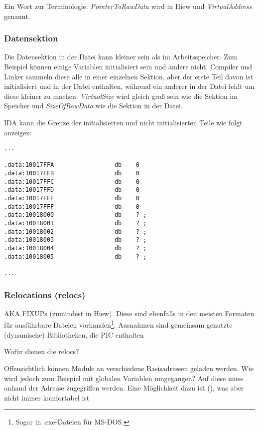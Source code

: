 Ein Wort zur Terminologie: \emph{PointerToRawData} wird in Hiew 
und \emph{VirtualAddress}  genannt.

\subsubsection{Datensektion}
Die Datensektion in der Datei kann kleiner sein als im Arbeitsspeicher. Zum
Beispiel können einige Variablen initialisiert sein und andere nicht.
Compiler und Linker sammeln diese alle in einer einzelnen Sektion, aber
der erste Teil davon ist initialisiert und in der Datei enthalten, während
ein anderer in der Datei fehlt um diese kleiner zu machen.
\emph{VirtualSize} wird gleich groß sein wie die Sektion im Speicher und
\emph{SizeOfRawData} wie die Sektion in der Datei.

IDA kann die Grenze der initialisierten und nicht initialisierten Teile
wie folgt anzeigen:

\begin{lstlisting}
...

.data:10017FFA                 db    0
.data:10017FFB                 db    0
.data:10017FFC                 db    0
.data:10017FFD                 db    0
.data:10017FFE                 db    0
.data:10017FFF                 db    0
.data:10018000                 db    ? ;
.data:10018001                 db    ? ;
.data:10018002                 db    ? ;
.data:10018003                 db    ? ;
.data:10018004                 db    ? ;
.data:10018005                 db    ? ;

...
\end{lstlisting}

\subsubsection{Relocations (relocs)}
\label{subsec:relocs}

\ac{AKA} FIXUPs (zumindest in Hiew).
Diese sind ebenfalls in den meisten Formaten für ausführbare Dateien
vorhanden\footnote{Sogar in .exe-Dateien für MS-DOS.}.
Ausnahmen sind gemeinsam genutzte (dynamische) Bibliotheken, die \ac{PIC} enthalten

Wofür dienen die relocs?

Offensichtlich können Module an verschiedene Basisadressen geladen werden. Wie
wird jedoch zum Beispiel mit globalen Variablen umgegangen?
Auf diese muss anhand der Adresse zugegriffen werden. Eine Möglichkeit dazu ist
\PICcode{} (), was aber nicht immer komfortabel ist

